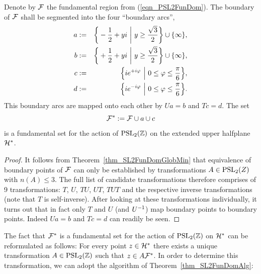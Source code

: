 \begin{theorem}
\label{thm_PSL2FunSet}
Denote by $\mathcal{F}$ the fundamental region from (\ref{eqn_PSL2FunDom}). The boundary of $\mathcal{F}$ shall be segmented into the four ``boundary arcs'',
\begin{eqnarray*}
a &:=& \bigg\{ -\frac{1}{2} + y i \ \bigg| \ y \ge \frac{\sqrt{3}}{2} \bigg\} \cup \{\infty\},\\
b &:=& \bigg\{ +\frac{1}{2} + y i \ \bigg| \ y \ge \frac{\sqrt{3}}{2} \bigg\} \cup \{\infty\},\\
c &:=& \Big\{ i e^{+i \varphi} \ \Big| \ 0 \le \varphi \le \frac{\pi}{6} \Big\},\\
d &:=& \Big\{ i e^{-i \varphi} \ \Big| \ 0 \le \varphi \le \frac{\pi}{6} \Big\}.
\end{eqnarray*}
This boundary arcs are mapped onto each other by $Ua = b$ and $Tc = d$. The set
\begin{equation}
\label{eqn_PSL2FunSet}
\mathcal{F}^\ast := \mathcal{F} \cup a \cup c
\end{equation}
is a fundamental set for the action of $\operatorname{PSL}_{2}(\mathbb{Z})$ on the extended upper halfplane $\mathcal{H}^\ast$.
\end{theorem}
\begin{proof}
It follows from Theorem~\ref{thm_SL2FunDomGlobMin} that equivalence of boundary points of $\mathcal{F}$ can only be established by transformations $A \in \operatorname{PSL}_{2}(Z)$ with $n(A) \le 3$. The full list of candidate transformations therefore comprises of 9 transformations: $T$, $U$, $TU$, $UT$, $TUT$ and the respective inverse transformations (note that $T$ is self-inverse). After looking at these transformations individually, it turns out that in fact only $T$ and $U$ (and ${U}^{-1}$) map boundary points to boundary points. Indeed $Ua = b$ and $Tc = d$ can readily be seen.
\end{proof}

The fact that $\mathcal{F}^\ast$ is a fundamental set for the action of $\operatorname{PSL}_{2}(\mathbb{Z})$ on $\mathcal{H}^\ast$ can be reformulated as follows: For every point $z \in \mathcal{H}^\ast$ there exists a unique transformation $A \in \operatorname{PSL}_{2}(\mathbb{Z})$ such that $z \in A \mathcal{F}^\ast$. In order to determine this transformation, we can adopt the algorithm of Theorem~\ref{thm_SL2FunDomAlg}:

